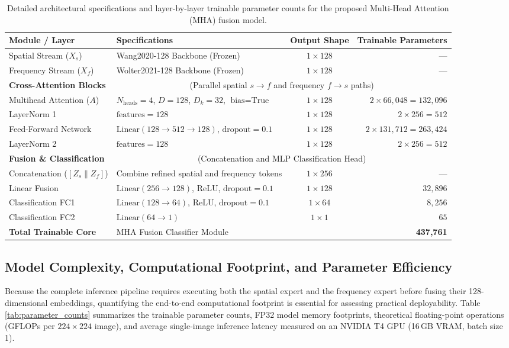 \documentclass[fleqn,10pt]{wlscirep}
\begin{document}
\begin{table}[htbp]
\centering
\begin{tabular}{|l|l|c|r|}
\hline
\textbf{Module / Layer} & \textbf{Specifications} & \textbf{Output Shape} & \textbf{Trainable Parameters} \\ \hline
Spatial Stream ($X_s$) & Wang2020-128 Backbone (Frozen) & $1 \times 128$ & — \\
Frequency Stream ($X_f$) & Wolter2021-128 Backbone (Frozen) & $1 \times 128$ & — \\ \hline
\textbf{Cross-Attention Blocks} & \multicolumn{3}{c|}{(Parallel spatial $s \to f$ and frequency $f \to s$ paths)} \\ \hline
Multihead Attention ($A$) & $N_{\text{heads}}=4$, $D=128$, $D_k=32$, $\text{bias}=\text{True}$ & $1 \times 128$ & $2 \times 66{,}048 = 132{,}096$ \\
LayerNorm 1 & $\text{features}=128$ & $1 \times 128$ & $2 \times 256 = 512$ \\
Feed-Forward Network & $\text{Linear}(128 \to 512 \to 128)$, $\text{dropout}=0.1$ & $1 \times 128$ & $2 \times 131{,}712 = 263{,}424$ \\
LayerNorm 2 & $\text{features}=128$ & $1 \times 128$ & $2 \times 256 = 512$ \\ \hline
\textbf{Fusion \& Classification} & \multicolumn{3}{c|}{(Concatenation and MLP Classification Head)} \\ \hline
Concatenation ($[Z_s \parallel Z_f]$) & Combine refined spatial and frequency tokens & $1 \times 256$ & — \\
Linear Fusion & $\text{Linear}(256 \to 128)$, $\text{ReLU}$, $\text{dropout}=0.1$ & $1 \times 128$ & $32{,}896$ \\
Classification FC1 & $\text{Linear}(128 \to 64)$, $\text{ReLU}$, $\text{dropout}=0.1$ & $1 \times 64$ & $8{,}256$ \\
Classification FC2 & $\text{Linear}(64 \to 1)$ & $1 \times 1$ & $65$ \\ \hline
\textbf{Total Trainable Core} & \multicolumn{2}{l|}{MHA Fusion Classifier Module} & \textbf{437,761} \\ \hline
\end{tabular}
\caption{\label{tab:mha_architecture}Detailed architectural specifications and layer-by-layer trainable parameter counts for the proposed Multi-Head Attention (MHA) fusion model.}
\end{table}

\subsection*{Model Complexity, Computational Footprint, and Parameter Efficiency}
Because the complete inference pipeline requires executing both the spatial expert and the frequency expert before fusing their 128-dimensional embeddings, quantifying the end-to-end computational footprint is essential for assessing practical deployability. Table \ref{tab:parameter_counts} summarizes the trainable parameter counts, FP32 model memory footprints, theoretical floating-point operations (GFLOPs per $224 \times 224$ image), and average single-image inference latency measured on an NVIDIA T4 GPU (16\,GB VRAM, batch size 1).
\end{document}

